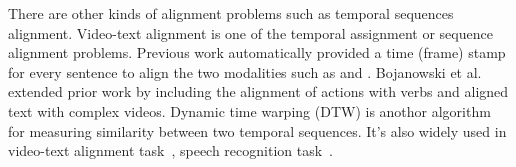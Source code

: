 There are other kinds of alignment problems such as temporal sequences alignment. Video-text alignment is one of the temporal assignment or sequence alignment problems. Previous work automatically provided a time (frame) stamp for every sentence to align the two modalities such as \cite{bojanowski2015weakly} and \cite{dogan2018neural}. Bojanowski et al.~\cite{bojanowski2015weakly} extended prior work by including the alignment of actions with verbs and aligned text with complex videos. Dynamic time warping (DTW) is anothor algorithm for measuring similarity between two temporal sequences. It's also widely used in video-text alignment task~\cite{dogan2018neural}, 
speech recognition task~\cite{vintsyuk1968speech}.



